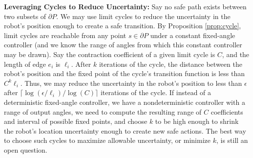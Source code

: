 \documentclass[]{styles/svproc}  %
\begin{document}
\textbf{Leveraging Cycles to Reduce Uncertainty:}
Say no safe path exists between two subsets of $\partial P$. We may
use limit cycles to reduce the uncertainty in the robot's position enough to
create a safe transition. By Proposition \ref{prop:cycle}, limit cycles are reachable from any point $s
\in \partial P$ under a constant fixed-angle controller (and we know the range
of angles from which this constant controller may be drawn). Say the contraction 
coefficient of a given limit cycle is $C$, and the length of edge $e_i$ is
$\ell_i$. After $k$ iterations of the cycle,
the distance between the robot's position and the fixed point of the cycle's transition
function is less than $C^k \ell_i$. Thus,
we may reduce the uncertainty in the robot's position to less than $\epsilon$
after $\lceil \log(\epsilon/\ell_i)/\log(C) \rceil$ iterations of the 
cycle. If instead of a deterministic fixed-angle controller, we have a
nondeterministic controller with a range of output angles, we need to
compute the resulting range of $C$ coefficients and interval of possible fixed
points, and choose $k$ to be high enough to shrink the robot's location
uncertainty enough to create new safe actions. The best way to choose such
cycles to maximize allowable uncertainty, or minimize $k$, is still an open
question.

%
\end{document}
